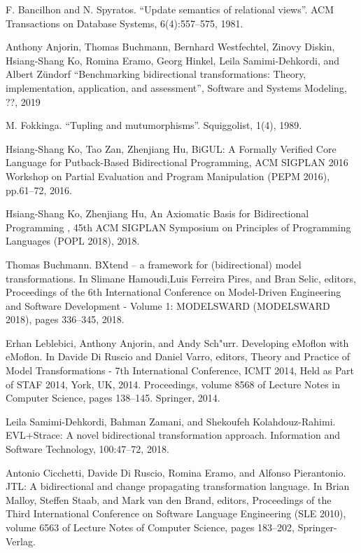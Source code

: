 \documentclass[runningheads]{llncs}
\begin{document}
% 
%
%
% 
% 
%
\begin{thebibliography}{8}
F. Bancilhon and N. Spyratos. ``Update semantics of relational views''. ACM Transactions on Database Systems, 6(4):557--575, 1981.

Anthony Anjorin, Thomas Buchmann, Bernhard Westfechtel, Zinovy Diskin, Hsiang-Shang Ko, Romina Eramo, Georg Hinkel, Leila Samimi-Dehkordi, and Albert Zündorf
``Benchmarking bidirectional transformations: Theory, implementation, application, and assessment'', Software and Systems Modeling, ??, 2019

  M. Fokkinga. ``Tupling and mutumorphisms''. Squiggolist, 1(4), 1989.

  Hsiang-Shang Ko, Tao Zan, Zhenjiang Hu, BiGUL: A Formally Verified Core Language for Putback-Based Bidirectional Programming, ACM SIGPLAN 2016 Workshop on Partial Evaluation and Program Manipulation (PEPM 2016), pp.61--72, 2016.

  Hsiang-Shang Ko, Zhenjiang Hu, An Axiomatic Basis for Bidirectional Programming , 45th ACM SIGPLAN Symposium on Principles of Programming Languages (POPL 2018), 2018.

  Thomas Buchmann. BXtend -- a framework for (bidirectional) model transformations. In Slimane Hamoudi,Luis Ferreira Pires, and Bran Selic, editors, Proceedings
of the 6th International Conference on Model-Driven Engineering and Software Development - Volume 1: MODELSWARD (MODELSWARD 2018), pages 336--345, 2018.

  Erhan Leblebici, Anthony Anjorin, and Andy Sch"{u}rr. Developing eMoflon with eMoflon. In Davide Di Ruscio and Daniel Varro, editors, Theory and Practice of Model Transformations - 7th International Conference, ICMT 2014, Held as Part of STAF 2014, York, UK, 2014. Proceedings, volume 8568 of Lecture Notes in
Computer Science, pages 138–145. Springer, 2014.

Leila Samimi-Dehkordi, Bahman Zamani, and Shekoufeh Kolahdouz-Rahimi. EVL+Strace: A novel bidirectional transformation approach. Information and Software
Technology, 100:47--72, 2018.

Antonio Cicchetti, Davide Di Ruscio, Romina Eramo, and Alfonso Pierantonio. JTL: A bidirectional and change propagating transformation language. In Brian Malloy, Steffen Staab, and Mark van den Brand, editors, Proceedings of the Third International Conference on Software Language Engineering (SLE 2010), volume 6563 of Lecture Notes of Computer Science, pages
183--202, Springer-Verlag.
  

\end{thebibliography}
\end{document}
